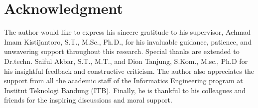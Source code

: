 \section*{Acknowledgment}
The author would like to express his sincere gratitude to his supervisor, Achmad Imam Kistijantoro, S.T., M.Sc., Ph.D., for his invaluable guidance, patience, and unwavering support throughout this research. Special thanks are extended to Dr.techn. Saiful Akbar, S.T., M.T., and Dion Tanjung, S.Kom., M.sc., Ph.D for his insightful feedback and constructive criticism. The author also appreciates the support from all the academic staff of the Informatics Engineering program at Institut Teknologi Bandung (ITB). Finally, he is thankful to his colleagues and friends for the inspiring discussions and moral support.
